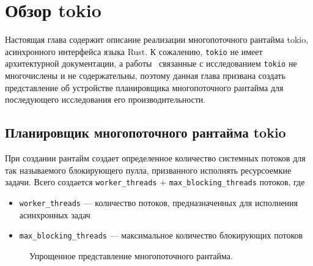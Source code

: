 
\section{Обзор tokio}

Настоящая глава содержит описание реализации многопоточного рантайма tokio, асинхронного интерфейса языка Rust. К сожалению, \verb|tokio| не имеет архитектурной документации, а работы~\cite{cringeTokioIOUring} связанные с исследованием \verb|tokio| не многочислены и не содержательны, поэтому данная глава призвана создать представление об устройстве планировщика многопоточного рантайма для последующего исследования его производительности.

\subsection{Планировщик многопоточного рантайма tokio}

При создании рантайм создает определенное количество системных потоков для так называемого блокирующего пулла, призванного исполнять ресурсоемкие задачи. Всего создается \verb|worker_threads| + \verb|max_blocking_threads| потоков, где

\begin{itemize}
    \item \verb|worker_threads| --- количество потоков, предназначенных для исполнения асинхронных задач
    \item \verb|max_blocking_threads| --- максимальное количество блокирующих потоков
\end{itemize}

\begin{figure}[H]
    \begin{center}
    \end{center}

    \caption{Упрощенное представление многопоточного рантайма.}
    \label{fig:tokio:arch}
\end{figure}

